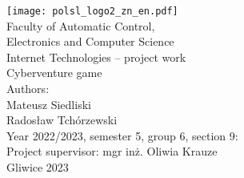 
\thispagestyle{empty}

\begin{titlepage}
{\centering
{}
\null
\vspace{-1.0in}
\texttt{[image: polsl\_logo2\_zn\_en.pdf]}\\[2.5em]
\normalfont\LARGE
Faculty of Automatic Control, \\Electronics and Computer Science \\[1.3em]
\normalfont\LARGE
Internet Technologies -- project work \\[1.5em]
\UseLMSSBoldFont\LARGE
Cyberventure game\\[5.2em]}
\normalfont\large
\noindent
Authors: 
\\[0.5em]
Mateusz Siedliski\\
Radosław Tchórzewski
\\[1.5em]
Year 2022/2023, semester 5, group 6, section 9: 
\\[0.5em]
Project supervisor: mgr inż. Oliwia Krauze
\\[1.5em]

\vfill
\centering Gliwice 2023
\par
\end{titlepage}




\pagestyle{plain}
\setcounter{page}{2}


\clearpage




\tableofcontents



\clearpage
